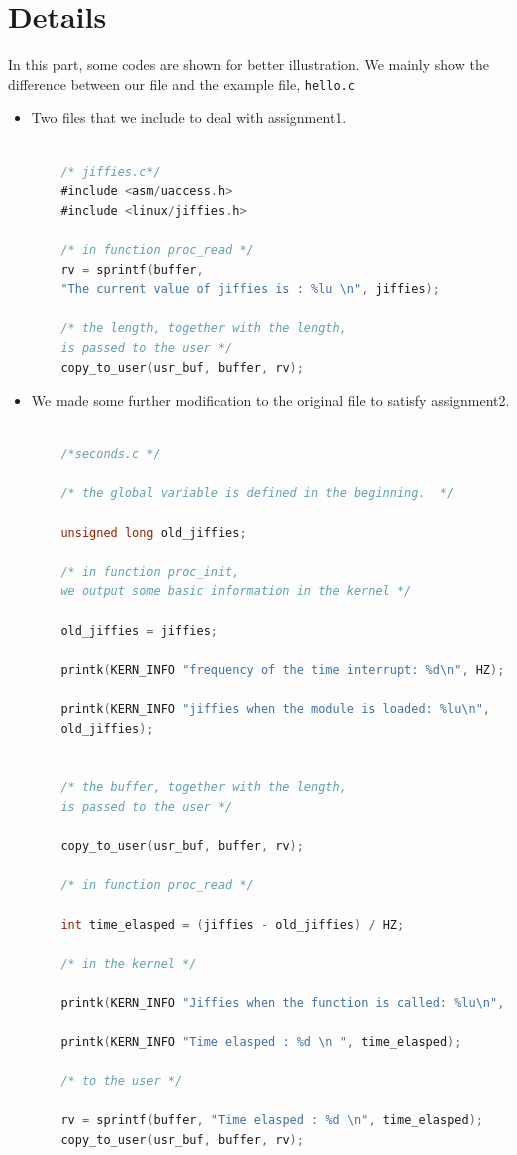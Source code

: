 \documentclass{article}
\begin{document}
\newpage
\section{Details}
In this part, some codes are shown for better illustration.  We mainly show the difference between our file and the example file, \texttt{hello.c}

\begin{itemize}
    \item Two files that we include to deal with assignment1. 
    \begin{lstlisting}[language=C]
    
    /* jiffies.c*/
    #include <asm/uaccess.h>
    #include <linux/jiffies.h>
    
    /* in function proc_read */
    rv = sprintf(buffer, 
    "The current value of jiffies is : %lu \n", jiffies);
    
    /* the length, together with the length, 
    is passed to the user */
    copy_to_user(usr_buf, buffer, rv);
    \end{lstlisting}
    
    \item We made some further modification to the original file to satisfy assignment2.
    
    
    \begin{lstlisting}[language=C]
    
    /*seconds.c */
    
    /* the global variable is defined in the beginning.  */
    
    unsigned long old_jiffies;
    
    /* in function proc_init,
    we output some basic information in the kernel */
    
    old_jiffies = jiffies;
    
    printk(KERN_INFO "frequency of the time interrupt: %d\n", HZ);
	
    printk(KERN_INFO "jiffies when the module is loaded: %lu\n",
	old_jiffies);
    
    
    /* the buffer, together with the length, 
    is passed to the user */
    
    copy_to_user(usr_buf, buffer, rv);
    
    /* in function proc_read */
    
    int time_elasped = (jiffies - old_jiffies) / HZ;
    
    /* in the kernel */
    
    printk(KERN_INFO "Jiffies when the function is called: %lu\n", jiffies);
	
    printk(KERN_INFO "Time elasped : %d \n ", time_elasped);

    /* to the user */
    
    rv = sprintf(buffer, "Time elasped : %d \n", time_elasped);
    copy_to_user(usr_buf, buffer, rv);
    
    \end{lstlisting}
    
\end{itemize} 
\end{document}
